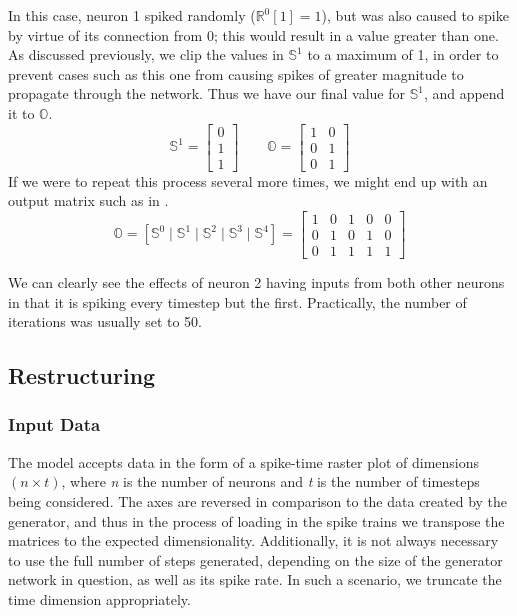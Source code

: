 In this case, neuron 1 spiked randomly ($\mathbb{R}^0[1] = 1$), but was also 
caused to spike by virtue of its connection from 0; this would result in a value 
greater than one. As discussed previously, we clip the values in $\mathbb{S}^1$ 
to a maximum of 1, in order to prevent cases such as this one from causing 
spikes of greater magnitude to propagate through the network.  Thus we have our 
final value for $\mathbb{S}^1$, and append it to $\mathbb{O}$.
\[
	\mathbb{S}^1 = \begin{bmatrix} 0 \\ 1 \\ 1 \end{bmatrix} \qquad
	\mathbb{O} = \begin{bmatrix}
		1 & 0\\
		0 & 1\\
		0 & 1 \end{bmatrix}
\]
If we were to repeat this process several more times, we might end up with an 
output matrix such as in .
\begin{equation*}
	\mathbb{O} = \left[ \mathbb{S}^0 \mid
		\mathbb{S}^1 \mid \mathbb{S}^2 \mid \mathbb{S}^3 \mid \mathbb{S}^4 
	\right] = \begin{bmatrix}
		1 & 0 & 1 & 0 & 0\\
		0 & 1 & 0 & 1 & 0\\
		0 & 1 & 1 & 1 & 1
	\end{bmatrix}
	\label{fig:exoutput}
\end{equation*}
{\captionsetup{width=.85\linewidth}
	\vspace{-8pt}
}

\noindent We can clearly see the effects of neuron 2 having inputs from both 
other neurons in that it is spiking every timestep but the first.
Practically, the number of iterations was usually set to 50.


\subsection{Restructuring}
\label{subsec:restructuring}

\subsubsection{Input Data}
The model accepts data in the form of a spike-time raster plot of dimensions $(n 
\times t)$, where \textit{n} is the number of neurons and \textit{t} is the 
number of timesteps being considered. The axes are reversed in comparison to the 
data created by the generator, and thus in the process of loading in the spike 
trains we transpose the matrices to the expected dimensionality. Additionally, 
it is not always necessary to use the full number of steps generated, depending 
on the size of the generator network in question, as well as its spike rate. In 
such a scenario, we truncate the time dimension appropriately.

